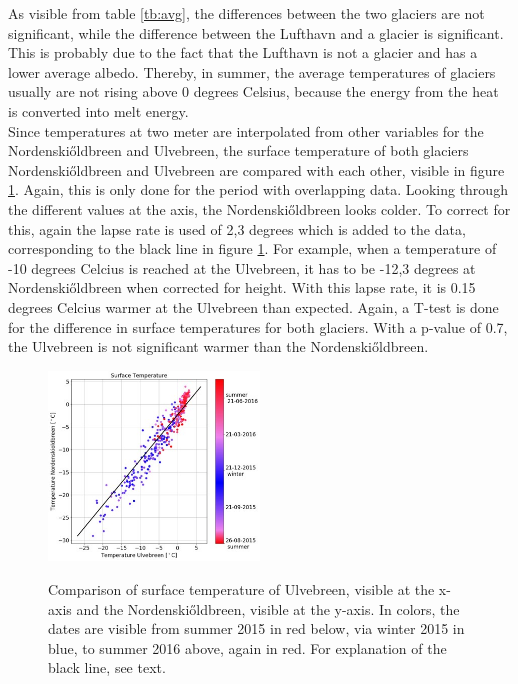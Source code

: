 \documentclass[11pt]{report}
\begin{document}
As visible from table \ref{tb:avg}, the differences between the two glaciers are not significant, while the difference between the Lufthavn and a glacier is significant. This is probably due to the fact that the Lufthavn is not a glacier and has a lower average albedo. Thereby, in summer, the average temperatures of glaciers usually are not rising above 0 degrees Celsius, because the energy from the heat is converted into melt energy.\\

Since temperatures at two meter are interpolated from other variables for the Nordenski\H{o}ldbreen and Ulvebreen, the surface temperature of both glaciers Nordenski\H{o}ldbreen and Ulvebreen are compared with each other, visible in figure 
\ref{fig:Tsurf}. Again, this is only done for the period with overlapping data. Looking through the different values at the axis, the Nordenski\H{o}ldbreen looks colder. To correct for this, again the lapse rate is used of 2,3 degrees which is added to the data, corresponding to the black line in figure \ref{fig:Tsurf}. For example, when a temperature of -10 degrees Celcius is reached at the Ulvebreen, it has to be -12,3 degrees at Nordenski\H{o}ldbreen when corrected for height. With this lapse rate, it is 0.15 degrees Celcius warmer at the Ulvebreen than expected. Again, a T-test is done for the difference in surface temperatures for both glaciers. With a p-value of 0.7, the Ulvebreen is not significant warmer than the Nordenski\H{o}ldbreen.

\begin{figure}[h]
\centering{}
    \includegraphics[scale=0.5, width=0.5\textwidth]{Tsurf.jpg}
    \label{fig:Tsurf}
    \caption{Comparison of surface temperature of Ulvebreen, visible at the x-axis and the Nordenski\H{o}ldbreen, visible at the y-axis. In colors, the dates are visible from summer 2015 in red below, via winter 2015 in blue, to summer 2016 above, again in red. For explanation of the black line, see text.}
\end{figure}
\end{document}
